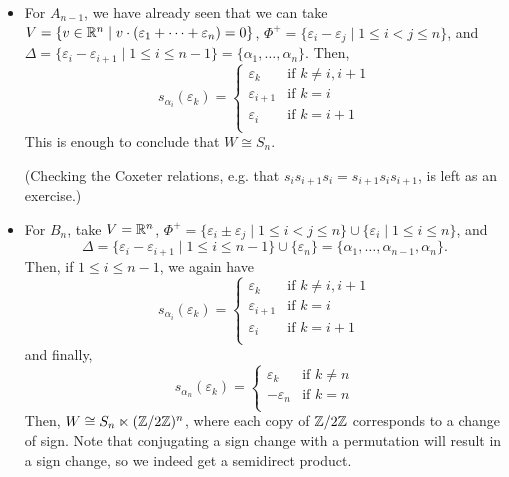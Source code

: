 \begin{itemize}
\item
For $A_{n-1}$, we have already seen that we can take
$V = \{v \in \mathbb{R}^n \mid v \cdot (\varepsilon_1 + \dots + \varepsilon_n) = 0\}$,
$\Phi^+ = \{\varepsilon_i - \varepsilon_j \mid 1 \leq i < j \leq n \}$, and
$\Delta = \{\varepsilon_i - \varepsilon_{i+1} \mid 1 \leq i \leq n-1 \}
= \{\alpha_1, \dots, \alpha_n\}$. Then,
\[
    s_{\alpha_i}(\varepsilon_k) = \begin{cases}
        \varepsilon_k & \text{if } k \neq i, i+1 \\
        \varepsilon_{i+1} & \text{if } k = i \\
        \varepsilon_{i} & \text{if } k = i+1 \\
    \end{cases}
\]
This is enough to conclude that $W \cong S_n$.

(Checking the Coxeter relations, e.g. that $s_{i} s_{i+1} s_{i} = s_{i+1} s_{i}
s_{i+1}$, is left as an exercise.)

\item
For $B_n$, take
$V = \mathbb{R}^n$, $\Phi^+ = \{\varepsilon_i \pm \varepsilon_j \mid 1 \leq i < j \leq n\}
\cup \{\varepsilon_i \mid 1 \leq i \leq n\}$, and
\[
\Delta = \{\varepsilon_i - \varepsilon_{i+1} \mid 1 \leq i \leq n-1\} \cup
\{\varepsilon_n\} = \{\alpha_1, \dots, \alpha_{n-1}, \alpha_n\}.
\]
Then, if $1 \leq i \leq n-1$, we again have
\[
    s_{\alpha_i}(\varepsilon_k) = \begin{cases}
        \varepsilon_k & \text{if } k \neq i, i+1 \\
        \varepsilon_{i+1} & \text{if } k = i \\
        \varepsilon_{i} & \text{if } k = i+1 \\
    \end{cases}
\]
and finally,
\[
    s_{\alpha_n}(\varepsilon_k) = \begin{cases}
        \varepsilon_k & \text{if } k \neq n \\
        -\varepsilon_n & \text{if } k = n \\
    \end{cases}
\]
Then, $W \cong S_n \ltimes (\mathbb{Z}/2\mathbb{Z})^n$, where each copy of $\mathbb{Z}/2\mathbb{Z}$ corresponds
to a change of sign. Note that conjugating a sign change with a permutation
will result in a sign change, so we indeed get a semidirect product.


\end{itemize}
